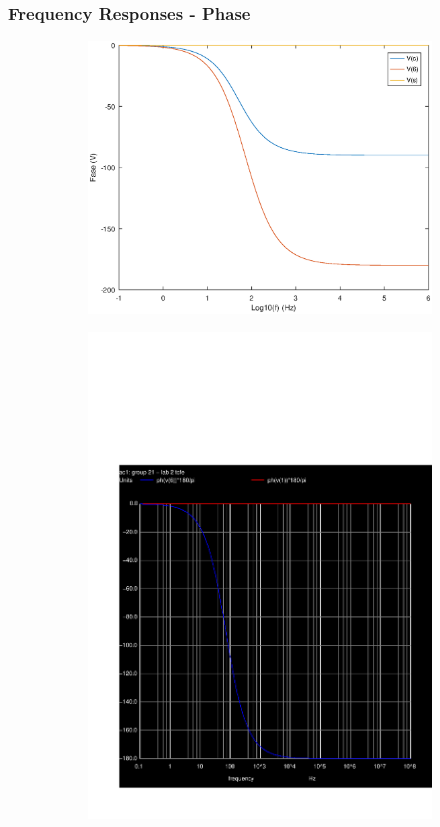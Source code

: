 \newpage
\subsubsection{Frequency Responses - Phase}

\begin{figure}[h!]
\centering
\begin{subfigure}{.5\textwidth}
  \centering
  \includegraphics[width=.9\linewidth]{phase.eps}
  \label{fig:test1}
\end{subfigure}%
\begin{subfigure}{.5\textwidth}
  \centering
  \includegraphics[width=.9\linewidth]{question5_ph.pdf}
  \label{fig:test2}
\end{subfigure}
\end{figure}
